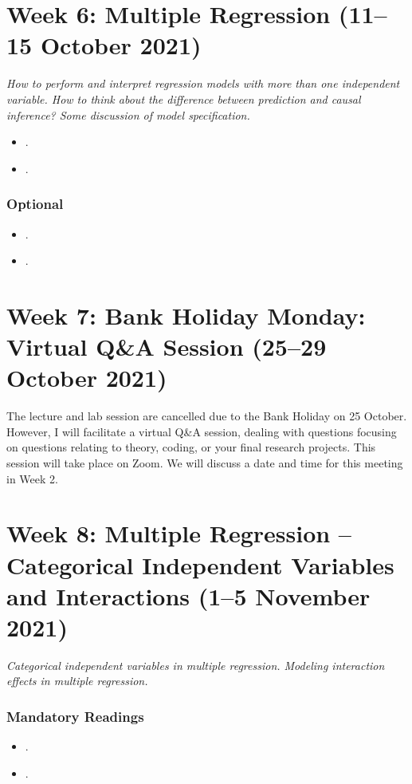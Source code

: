 \documentclass[abstract=on,parskip=full,headings=standardclasses,fontsize=11pt,paper=a4]{scrartcl}
\begin{document}
\section{Week 6:  Multiple Regression (11--15 October 2021)}

\textit{How to perform and interpret regression models with more than one independent variable. How to think about the difference between prediction and causal inference? Some discussion of model specification.}


\begin{itemize}
\item {}.
\item {}.
\end{itemize}

\subsubsection*{Optional}
\begin{itemize}
\item {}.
\item {}.
\end{itemize}

\section{Week 7:  Bank Holiday Monday: Virtual Q\&A Session  (25--29 October 2021)}


The lecture and lab session are cancelled due to the  Bank Holiday on 25 October. However, I will facilitate a virtual Q\&A session, dealing with questions focusing on questions relating to theory, coding, or your final research projects. This session will take place on Zoom. We will discuss a date and time for this meeting in Week 2.

\section{Week 8: Multiple Regression -- Categorical Independent Variables and Interactions (1--5 November 2021)}


\textit{Categorical independent variables in multiple regression. Modeling interaction effects in multiple regression.}

\subsubsection*{Mandatory Readings}
\begin{itemize}
\item {}.
\item {}.
\end{itemize}
\end{document}
